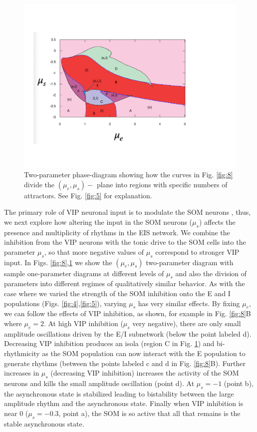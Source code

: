 \documentclass[10pt,letterpaper]{article}
\begin{document}
\begin{figure}
\includegraphics[width=.9\textwidth]{afig10.pdf}
\caption{Two-parameter phase-diagram showing how the curves in Fig. \ref{fig:8} divide the $(\mu_e,\mu_s)-$ plane into regions with specific numbers of attractors. See Fig. \ref{fig:5} for explanation.}
\label{fig:8b}
\end{figure}





The primary role of VIP neuronal input is to modulate the SOM neurons \cite{veit23}, thus, we next explore how altering the input in the SOM neurons ($\mu_s$) affects the presence and multiplicity of rhythms in the EIS network. We combine the inhibition from the VIP neurons with the tonic drive to the SOM cells into the parameter $\mu_s$, so that more negative values of $\mu_s$ correspond to stronger VIP input. 
In Figs. \ref{fig:8},\ref{fig:8b} we show the $(\mu_e,\mu_s)$ two-parameter diagram with sample one-parameter diagrams at different levels of $\mu_s$ and also the division of parameters into different regimes of qualitatively similar behavior.
As with the case where we varied the strength of the SOM inhibition onto the E and I populations (Figs. \ref{fig:4},\ref{fig:5}), varying $\mu_s$ has very similar effects.  By fixing $\mu_e$, we can follow the effects of VIP inhibition, as shown, for example in Fig. \ref{fig:8}B where $\mu_e=2$.   At high VIP inhibition ($\mu_s$ very negative), there are only small amplitude oscillations driven by the E/I subnetwork (below the point labeled d). Decreasing VIP inhibition produces an isola (region C in Fig. \ref{fig:8b}) and bi-rhythmicity as the SOM population can now interact with the E population to generate rhythms (between the points labeled c and d in Fig. \ref{fig:8}B). Further increases in $\mu_s$ (decreasing VIP inhibition) increases the activity of the SOM neurons and kills the small amplitude oscillation (point d). At $\mu_s=-1$ (point b), the asynchronous state is stabilized leading to bistability between the large amplitude rhythm and the asynchronous state.  Finally when VIP inhibition is near 0 ($\mu_s=-0.3$, point a), the SOM is so active that all that remains is the stable asynchronous state. 
\end{document}
